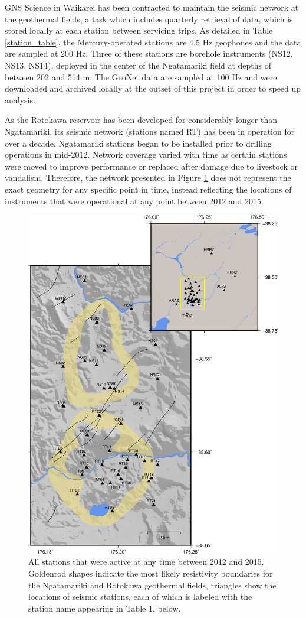 GNS Science in Waikarei has been contracted to maintain the seismic network at the geothermal fields, a task which includes quarterly retrieval of data, which is stored locally at each station between servicing trips. As detailed in Table \ref{station_table}, the Mercury-operated stations are 4.5 Hz geophones and the data are sampled at 200 Hz. Three of these stations are borehole instruments (NS12, NS13, NS14), deployed in the center of the Ngatamariki field at depths of between 202 and 514 m. The GeoNet data are sampled at 100 Hz and were downloaded and archived locally at the outset of this project in order to speed up analysis.

As the Rotokawa reservoir has been developed for considerably longer than Ngatamariki, its seismic network (stations named RT) has been in operation for over a decade. Ngatamariki stations began to be installed prior to drilling operations in mid-2012. Network coverage varied with time as certain stations were moved to improve performance or replaced after damage due to livestock or vandalism. Therefore, the network presented in Figure \ref{322599} does not represent the exact geometry for any specific point in time, instead reflecting the locations of instruments that were operational at any point between 2012 and 2015.
\begin{figure}[h!]
\begin{center}
\includegraphics[width=0.70\columnwidth]{Chapter_2_Data/figures/RotNga_stations_overview/RotNga_stations_overview_original}
\caption{{All stations that were active at any time between 2012 and 2015.
Goldenrod shapes indicate the most likely resistivity boundaries for the
Ngatamariki and Rotokawa geothermal fields, triangles show the locations
of seismic stations, each of which is labeled with the station name
appearing in Table 1, below.
{\label{322599}}%
}}
\end{center}
\end{figure}
